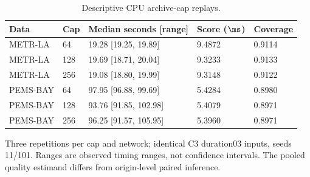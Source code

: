 \begin{table}[p]
\caption{Descriptive CPU archive-cap replays.}\label{tab:runtime}
\centering\small
\begin{tabular}{lllll}\toprule
Data & Cap & Median seconds [range] & Score ($\ms$) & Coverage \\\midrule
METR-LA & 64 & 19.28 [19.25, 19.89] & 9.4872 & 0.9114 \\
METR-LA & 128 & 19.69 [18.71, 20.04] & 9.3233 & 0.9133 \\
METR-LA & 256 & 19.08 [18.80, 19.99] & 9.3148 & 0.9122 \\
PEMS-BAY & 64 & 97.95 [96.88, 99.69] & 5.4284 & 0.8980 \\
PEMS-BAY & 128 & 93.76 [91.85, 102.98] & 5.4079 & 0.8971 \\
PEMS-BAY & 256 & 96.25 [91.57, 105.95] & 5.3960 & 0.8971 \\
\bottomrule\end{tabular}
\par\smallskip\footnotesize Three repetitions per cap and network; identical C3 duration03 inputs, seeds 11/101. Ranges are observed timing ranges, not confidence intervals. The pooled quality estimand differs from origin-level paired inference.
\end{table}\clearpage
